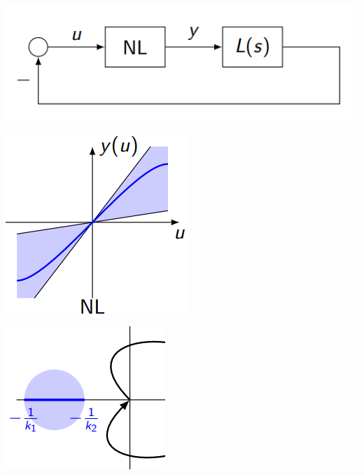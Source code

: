 \includegraphics[width = \linewidth]{src/images/nolinearity_block_diagram.png}
\begin{minipage}{0.49\linewidth}
    \includegraphics[width = \linewidth]{src/images/nolinearity_plot.png}
\end{minipage}
\begin{minipage}{0.49\linewidth}
    \includegraphics[width = \linewidth]{src/images/nolinearity_nyquist.png}
\end{minipage}

